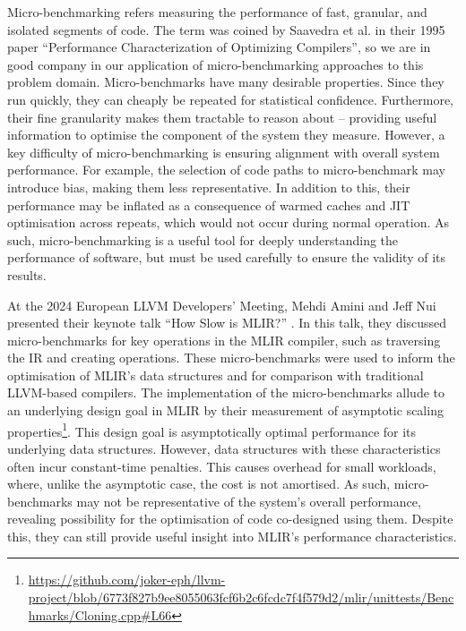 Micro-benchmarking refers measuring the performance of fast, granular, and isolated segments of code.
The term was coined by Saavedra et al. in their 1995 paper \cite{saavedraPerformanceCharacterizationOptimizing1995} ``Performance Characterization of Optimizing Compilers'', so we are in good company in our application of micro-benchmarking approaches to this problem domain.
Micro-benchmarks have many desirable properties. Since they run quickly, they can cheaply be repeated for statistical confidence.
Furthermore, their fine granularity makes them tractable to reason about -- providing useful information to optimise the component of the system they measure.
However, a key difficulty of micro-benchmarking is ensuring alignment with overall system performance. For example, the selection of code paths to micro-benchmark may introduce bias, making them less representative. In addition to this, their performance may be inflated as a consequence of warmed caches and JIT optimisation across repeats, which would not occur during normal operation.
As such, micro-benchmarking is a useful tool for deeply understanding the performance of software, but must be used carefully to ensure the validity of its results.

At the 2024 European LLVM Developers' Meeting, Mehdi Amini and Jeff Nui
presented their keynote talk ``How Slow is MLIR?'' \cite{aminiHowSlowMLIR2024}.
In this talk, they discussed micro-benchmarks for key operations in the MLIR compiler, such as traversing the IR and creating operations. These micro-benchmarks were used to inform the optimisation of MLIR's data structures and for comparison with traditional LLVM-based compilers. The implementation of the micro-benchmarks allude to an underlying design goal in MLIR by their measurement of asymptotic scaling properties\footnote{\url{https://github.com/joker-eph/llvm-project/blob/6773f827b9ee8055063fcf6b2c6fcdc7f4f579d2/mlir/unittests/Benchmarks/Cloning.cpp\#L66}}. This design goal is asymptotically optimal performance for its underlying data structures. However, data structures with these characteristics often incur constant-time penalties. %
This causes overhead for small workloads, where, unlike the asymptotic case, the cost is not amortised. As such, micro-benchmarks may not be representative of the system's overall performance, revealing possibility for the optimisation of code co-designed using them.
Despite this, they can still provide useful insight into MLIR's performance characteristics.


